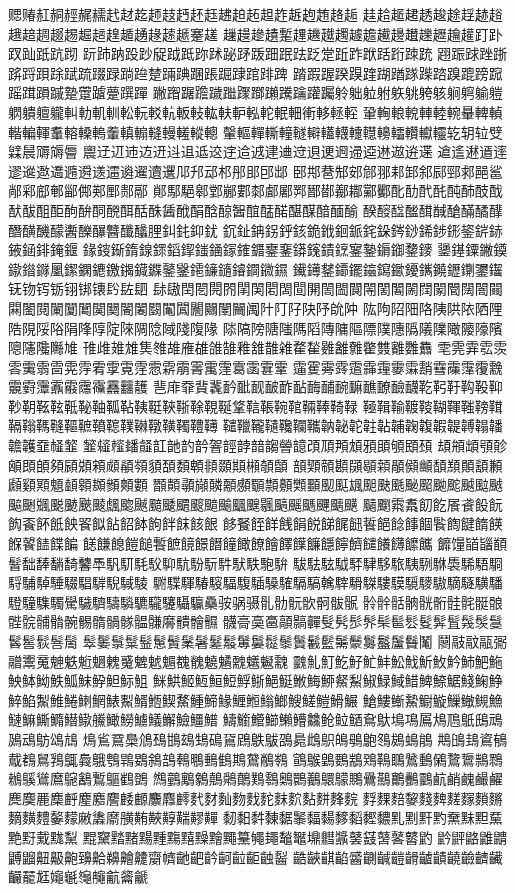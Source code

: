 䞏䞐䞑䞒䞓䞔䞕䞖䞗䞘䞙䞚䞛䞜䞝䞞䞟䞠䞡䞢䞣䞤䞥䞦䞧
䞨䞩䞪䞫䞬䞭䞮䞯䞰䞱䞲䞳䞴䞵䞶䞷䞸䞹䞺䞻䞼䞽䞾䞿䟀
䟁䟂䟃䟄䟅䟆䟇䟈䟉䟊䟋䟌䟍䟎䟏䟐䟑䟒䟓䟔䟕䟖䟗䟘䟙
䟚䟛䟜䟝䟞䟟䟠䟡䟢䟣䟤䟥䟦䟧䟨䟩䟪䟫䟬䟭䟮䟯䟰䟱䟲
䟳䟴䟵䟶䟷䟸䟹䟺䟻䟼䟽䟾䟿䠀䠁䠂䠃䠄䠅䠆䠇䠈䠉䠊䠋
䠌䠍䠎䠏䠐䠑䠒䠓䠔䠕䠖䠗䠘䠙䠚䠛䠜䠝䠞䠟䠠䠡䠢䠣䠤
䠥䠦䠧䠨䠩䠪䠫䠬䠭䠮䠯䠰䠱䠲䠳䠴䠵䠶䠷䠸䠹䠺䠻䠼䠽
䠾䠿䡀䡁䡂䡃䡄䡅䡆䡇䡈䡉䡊䡋䡌䡍䡎䡏䡐䡑䡒䡓䡔䡕䡖
䡗䡘䡙䡚䡛䡜䡝䡞䡟䡠䡡䡢䡣䡤䡥䡦䡧䡨䡩䡪䡫䡬䡭䡮䡯
䡰䡱䡲䡳䡴䡵䡶䡷䡸䡹䡺䡻䡼䡽䡾䡿䢀䢁䢂䢃䢄䢅䢆䢇䢈
䢉䢊䢋䢌䢍䢎䢏䢐䢑䢒䢓䢔䢕䢖䢗䢘䢙䢚䢛䢜䢝䢞䢟䢠䢡
䢢䢣䢤䢥䢦䢧䢨䢩䢪䢫䢬䢭䢮䢯䢰䢱䢲䢳䢴䢵䢶䢷䢸䢹䢺
䢻䢼䢽䢾䢿䣀䣁䣂䣃䣄䣅䣆䣇䣈䣉䣊䣋䣌䣍䣎䣏䣐䣑䣒䣓
䣔䣕䣖䣗䣘䣙䣚䣛䣜䣝䣞䣟䣠䣡䣢䣣䣤䣥䣦䣧䣨䣩䣪䣫䣬
䣭䣮䣯䣰䣱䣲䣳䣴䣵䣶䣷䣸䣹䣺䣻䣼䣽䣾䣿䤀䤁䤂䤃䤄䤅
䤆䤇䤈䤉䤊䤋䤌䤍䤎䤏䤐䤑䤒䤓䤔䤕䤖䤗䤘䤙䤚䤛䤜䤝䤞
䤟䤠䤡䤢䤣䤤䤥䤦䤧䤨䤩䤪䤫䤬䤭䤮䤯䤰䤱䤲䤳䤴䤵䤶䤷
䤸䤹䤺䤻䤼䤽䤾䤿䥀䥁䥂䥃䥄䥅䥆䥈䥉䥊䥋䥌䥍䥎䥏䥐䥑
䥒䥓䥔䥕䥖䥗䥘䥙䥚䥛䥜䥝䥞䥟䥠䥡䥢䥣䥤䥥䥦䥧䥨䥩䥪
䥫䥬䥭䥮䥯䥰䥱䥲䥳䥴䥵䥶䥷䥸䥹䥻䥼䥾䥿䦀䦁䦄䦇䦈䦉
䦊䦋䦌䦍䦎䦏䦐䦑䦒䦓䦔䦕䦖䦗䦘䦙䦚䦜䦝䦞䦠䦡䦢䦣䦤
䦥䦦䦧䦨䦩䦪䦫䦬䦭䦮䦯䦰䦱䦲䦳䦴䦵䦸䦹䦺䦻䦼䦽䦾䦿
䧀䧁䧂䧃䧄䧅䧆䧇䧈䧉䧊䧋䧌䧍䧎䧏䧐䧑䧒䧓䧔䧕䧖䧗䧘
䧙䧚䧛䧜䧝䧞䧟䧠䧡䧢䧣䧤䧥䧦䧧䧨䧩䧪䧫䧬䧭䧮䧯䧰䧱
䧲䧳䧴䧵䧶䧷䧸䧹䧺䧻䧼䧽䧾䧿䨀䨁䨂䨃䨄䨅䨆䨇䨈䨉䨊
䨋䨌䨍䨎䨏䨐䨑䨒䨓䨔䨕䨖䨗䨘䨙䨚䨛䨜䨝䨞䨟䨠䨡䨢䨣
䨤䨥䨦䨧䨨䨩䨪䨫䨬䨭䨮䨯䨰䨱䨲䨳䨴䨵䨶䨷䨸䨹䨺䨻䨼
䨽䨾䨿䩀䩁䩂䩃䩄䩅䩆䩇䩈䩉䩊䩋䩌䩍䩎䩏䩐䩑䩒䩓䩔䩕
䩖䩗䩘䩙䩚䩛䩜䩝䩞䩟䩠䩡䩢䩣䩤䩥䩦䩧䩨䩩䩪䩫䩬䩭䩮
䩯䩰䩱䩲䩳䩴䩵䩶䩷䩸䩹䩺䩻䩼䩽䩾䩿䪀䪁䪂䪃䪄䪅䪆䪇
䪈䪉䪊䪋䪌䪍䪎䪏䪐䪑䪒䪓䪔䪕䪖䪗䪘䪙䪚䪛䪜䪝䪞䪟䪠
䪡䪢䪣䪤䪥䪦䪧䪨䪩䪪䪫䪬䪭䪮䪯䪰䪱䪲䪳䪴䪵䪶䪷䪸䪹
䪺䪻䪼䪽䪾䪿䫀䫁䫂䫃䫄䫅䫆䫇䫈䫉䫊䫋䫌䫍䫎䫏䫐䫑䫒
䫓䫔䫕䫖䫗䫘䫙䫚䫛䫜䫝䫞䫟䫠䫡䫢䫣䫤䫥䫦䫧䫨䫩䫪䫫
䫬䫭䫮䫯䫰䫱䫲䫳䫴䫵䫶䫷䫸䫹䫺䫻䫼䫽䫾䫿䬀䬁䬂䬃䬄
䬅䬆䬇䬈䬉䬊䬋䬌䬍䬎䬏䬐䬑䬒䬓䬔䬕䬖䬗䬘䬙䬚䬛䬜䬝
䬞䬟䬠䬡䬢䬣䬤䬥䬦䬧䬨䬩䬪䬫䬬䬭䬮䬯䬰䬱䬲䬳䬴䬵䬶
䬷䬸䬹䬺䬻䬼䬽䬾䬿䭀䭁䭂䭃䭄䭅䭆䭇䭈䭉䭊䭋䭌䭍䭎䭏
䭐䭑䭒䭓䭔䭕䭖䭗䭘䭙䭚䭛䭜䭝䭞䭟䭠䭡䭢䭣䭤䭥䭦䭧䭨
䭩䭪䭫䭬䭭䭮䭯䭰䭱䭲䭳䭴䭵䭶䭷䭸䭹䭺䭻䭼䭽䭾䭿䮀䮁
䮂䮃䮄䮅䮆䮇䮈䮉䮊䮋䮌䮍䮎䮏䮐䮑䮒䮓䮔䮕䮖䮗䮘䮙䮚
䮛䮜䮝䮞䮟䮠䮡䮢䮣䮤䮥䮦䮧䮨䮩䮪䮫䮬䮭䮮䮯䮰䮱䮲䮳
䮴䮵䮶䮷䮸䮹䮺䮻䮼䮽䮾䮿䯀䯁䯂䯃䯄䯅䯆䯇䯈䯉䯊䯋䯌
䯍䯎䯏䯐䯑䯒䯓䯔䯕䯖䯗䯘䯙䯚䯛䯜䯝䯞䯟䯠䯡䯢䯣䯤䯥
䯦䯧䯨䯩䯪䯫䯬䯭䯮䯯䯰䯱䯲䯳䯴䯵䯶䯷䯸䯹䯺䯻䯼䯽䯾
䯿䰀䰁䰂䰃䰄䰅䰆䰇䰈䰉䰊䰋䰌䰍䰎䰏䰐䰑䰒䰓䰔䰕䰖䰗
䰘䰙䰚䰛䰜䰝䰞䰟䰠䰡䰢䰣䰤䰥䰦䰧䰨䰩䰪䰫䰬䰭䰮䰯䰰
䰱䰲䰳䰴䰵䰶䰷䰸䰹䰺䰻䰼䰽䰾䰿䱀䱁䱂䱃䱄䱅䱆䱇䱈䱉
䱊䱋䱌䱍䱎䱏䱐䱑䱒䱓䱔䱕䱖䱗䱘䱙䱚䱛䱜䱝䱞䱟䱠䱡䱢
䱣䱤䱥䱦䱧䱨䱩䱪䱫䱬䱭䱮䱯䱰䱱䱲䱳䱴䱵䱶䱸䱹䱺䱻䱼
䱽䱾䱿䲀䲁䲂䲃䲄䲅䲆䲇䲈䲉䲊䲋䲌䲍䲎䲏䲐䲑䲒䲓䲔䲕
䲖䲗䲘䲙䲚䲛䲜䲝䲞䲤䲥䲦䲧䲨䲩䲪䲫䲬䲭䲮䲯䲰䲱䲲䲳
䲴䲵䲶䲷䲸䲹䲺䲻䲼䲽䲾䲿䳀䳁䳂䳃䳄䳅䳆䳇䳈䳉䳊䳋䳌
䳍䳎䳏䳐䳑䳒䳓䳔䳕䳖䳗䳘䳙䳚䳛䳜䳝䳞䳟䳠䳡䳢䳣䳤䳥
䳦䳧䳨䳩䳪䳫䳬䳭䳮䳯䳰䳱䳲䳳䳴䳵䳶䳷䳸䳹䳺䳻䳼䳽䳾
䳿䴀䴁䴂䴃䴄䴅䴆䴇䴈䴉䴊䴋䴌䴍䴎䴏䴐䴑䴒䴚䴛䴜䴝䴞
䴟䴠䴡䴢䴣䴤䴥䴦䴧䴨䴩䴪䴫䴬䴭䴮䴯䴰䴱䴲䴳䴴䴵䴶䴷
䴸䴹䴺䴻䴼䴽䴾䴿䵀䵁䵂䵃䵄䵅䵆䵇䵈䵉䵊䵋䵌䵍䵎䵏䵐
䵑䵒䵓䵔䵕䵖䵗䵘䵙䵚䵛䵜䵝䵞䵟䵠䵡䵢䵣䵤䵥䵦䵧䵨䵩
䵪䵫䵬䵭䵮䵯䵰䵱䵲䵳䵴䵵䵶䵷䵸䵹䵺䵻䵼䵽䵾䵿䶀䶁䶂
䶃䶄䶅䶆䶇䶈䶉䶊䶋䶌䶍䶎䶏䶐䶑䶒䶓䶔䶕䶖䶗䶘䶙䶚䶛
䶜䶝䶞䶟䶠䶡䶢䶣䶤䶥䶦䶧䶨䶩䶪䶫䶬䶭䶯䶰䶱䶲䶳䶴䶵


